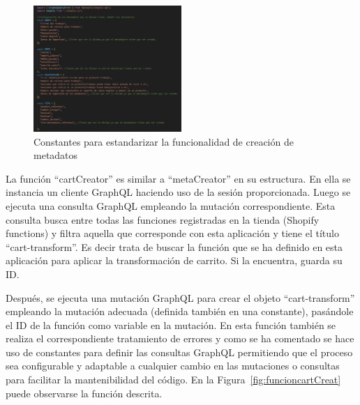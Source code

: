 \documentclass[12pt]{article}
\begin{document}
\begin{figure}[ht]
    \centering
    \includegraphics[width=0.5\textwidth]{imagenes-back/metafieldCreatorConstantes1.png}
    \caption{\label{fig:constantesMetafields} Constantes para estandarizar la funcionalidad de creación de metadatos }
    \vspace{\fill}
\end{figure}

La función ``cartCreator'' es similar a ``metaCreator'' en su estructura. En ella se instancia un cliente GraphQL haciendo uso de la sesión
proporcionada. Luego se ejecuta una consulta GraphQL empleando la mutación correspondiente. Esta consulta 
busca entre todas las funciones registradas en la tienda (Shopify functions) y filtra aquella que corresponde con esta aplicación y tiene el título ``cart-transform''.
Es decir trata de buscar la función que se ha definido en esta aplicación para aplicar la transformación de carrito. Si la encuentra, guarda su ID.

Después, se ejecuta una mutación GraphQL para crear el objeto ``cart-transform'' empleando la mutación adecuada (definida también en una constante), pasándole
el ID de la función como variable en la mutación. En esta función también se realiza el correspondiente tratamiento de errores y como se ha comentado
se hace uso de constantes para definir las consultas GraphQL permitiendo que el proceso sea configurable y adaptable a cualquier cambio en las mutaciones
o consultas para facilitar la mantenibilidad del código. En la Figura~\ref{fig:funcioncartCreat} puede observarse la función descrita.
\end{document}

